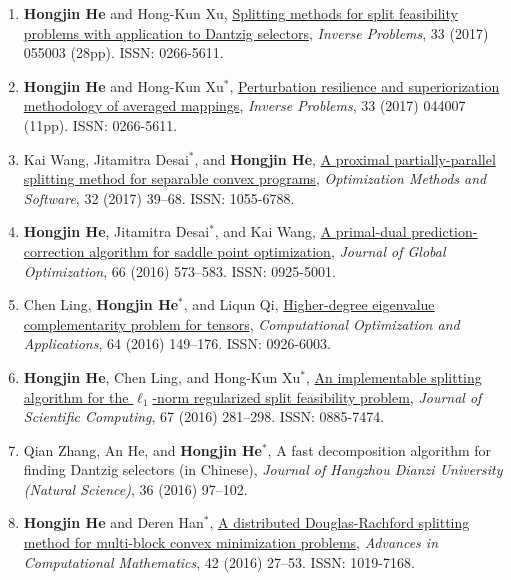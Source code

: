 \begin{enumerate}
\item {\bf\color{black}Hongjin He} and Hong-Kun Xu, \href{http://iopscience.iop.org/article/10.1088/1361-6420/aa5ec5}{\color{blue}Splitting methods for split feasibility problems with application to Dantzig selectors}, {\it Inverse Problems}, 33 (2017) 055003 (28pp). ISSN: 0266-5611.

\item {\bf\color{black}Hongjin He} and Hong-Kun Xu$^*$, \href{http://iopscience.iop.org/article/10.1088/1361-6420/33/4/044007}{\color{blue}Perturbation resilience and superiorization methodology of averaged mappings}, {\it Inverse Problems}, 33 (2017) 044007 (11pp). ISSN: 0266-5611.

\item Kai Wang, Jitamitra Desai$^*$, and {\bf\color{black}Hongjin He}, \href{http://dx.doi.org/10.1080/10556788.2016.1200044}{A proximal partially-parallel splitting method for separable convex programs}, {\it Optimization Methods and Software}, 32 (2017) 39--68. ISSN: 1055-6788.

\item {\bf\color{black}Hongjin He}, Jitamitra Desai$^*$, and Kai Wang, \href{http://link.springer.com/article/10.1007/s10898-016-0437-1}{\color{blue}A primal-dual prediction-correction algorithm for saddle point optimization}, {\it Journal of Global Optimization}, 66 (2016) 573--583. ISSN: 0925-5001.

\item Chen Ling, {\bf\color{black}Hongjin He}$^*$, and Liqun Qi, \href{http://link.springer.com/article/10.1007/s10589-015-9805-x}{\color{blue}Higher-degree eigenvalue complementarity problem for tensors}, {\it Computational Optimization and Applications},  64 (2016) 149--176. ISSN: 0926-6003.

\item {\bf\color{black}Hongjin He}, Chen Ling, and Hong-Kun Xu$^*$, \href{http://link.springer.com/article/10.1007/s10915-015-0078-4}{\color{blue}An implementable splitting algorithm for the $\ell_1$-norm regularized split feasibility problem}, {\it Journal of Scientific Computing}, 67 (2016) 281--298. ISSN: 0885-7474.

\item Qian Zhang, An He, and {\bf\color{black}Hongjin He}$^*$, A fast decomposition algorithm for finding Dantzig selectors (in Chinese), {\it Journal of Hangzhou Dianzi University (Natural Science)}, 36 (2016) 97--102.

\item {\bf\color{black}Hongjin He} and Deren Han$^*$, \href{http://link.springer.com/article/10.1007/s10444-015-9408-1}{\color{blue}A distributed Douglas-Rachford splitting method for multi-block convex minimization problems}, {\it Advances in Computational Mathematics}, 42 (2016) 27--53. ISSN: 1019-7168.


\end{enumerate}
